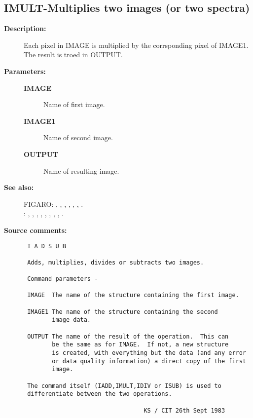 \subsection{IMULT-\label{IMULT}Multiplies two images (or two spectra)}
\begin{description}

\item [{\bf Description:}]
 Each pixel in IMAGE is multiplied by the corrsponding
 pixel of IMAGE1.  The result is troed in OUTPUT.

\item [{\bf Parameters:}]
\begin{description}
\item [{\bf IMAGE}]
 Name of first image.
\item [{\bf IMAGE1}]
 Name of second image.
\item [{\bf OUTPUT}]
 Name of resulting image.
\end{description}

\item [{\bf See also:}]
FIGARO: , , , , , , .\\
: , , , , , , , , .\\

\item [{\bf Source comments:}]
\begin{verbatim}
 I A D S U B

 Adds, multiplies, divides or subtracts two images.

 Command parameters -

 IMAGE  The name of the structure containing the first image.

 IMAGE1 The name of the structure containing the second
        image data.

 OUTPUT The name of the result of the operation.  This can
        be the same as for IMAGE.  If not, a new structure
        is created, with everything but the data (and any error
        or data quality information) a direct copy of the first
        image.

 The command itself (IADD,IMULT,IDIV or ISUB) is used to
 differentiate between the two operations.

                                  KS / CIT 26th Sept 1983
\end{verbatim}
\end{description}
